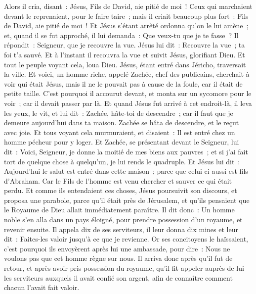 \begin{multicols}{2}
Alors il cria, disant~: Jésus, Fils de David, aie pitié de moi~!
Ceux qui marchaient devant le reprenaient, pour le faire taire~; mais il criait beaucoup plus fort~: Fils de David, aie pitié de moi~!
Et Jésus s'étant arrêté ordonna qu'on le lui amène~; et, quand il se fut approché,
il lui demanda~: Que veux-tu que je te fasse~? Il répondit~: Seigneur, que je recouvre la vue.
Jésus lui dit~: Recouvre la vue~; ta foi t'a sauvé.
Et à l'instant il recouvra la vue et suivit Jésus, glorifiant Dieu. Et tout le peuple voyant cela, loua Dieu.
\VerseOne{}Jésus, étant entré dans Jéricho, traversait la ville.
Et voici, un homme riche, appelé Zachée, chef des publicains, cherchait à voir qui était Jésus,
mais il ne le pouvait pas à cause de la foule, car il était de petite taille.
C'est pourquoi il accourut devant, et monta sur un sycomore pour le voir~; car il devait passer par là.
Et quand Jésus fut arrivé à cet endroit-là, il leva les yeux, le vit, et lui dit~: Zachée, hâte-toi de descendre~; car il faut que je demeure aujourd'hui dans ta maison.
Zachée se hâta de descendre, et le reçut avec joie.
Et tous voyant cela murmuraient, et disaient~: Il est entré chez un homme pécheur pour y loger.
Et Zachée, se présentant devant le Seigneur, lui dit~: Voici, Seigneur, je donne la moitié de mes biens aux pauvres~; et si j'ai fait tort de quelque chose à quelqu'un, je lui rends le quadruple.
Et Jésus lui dit~: Aujourd'hui le salut est entré dans cette maison~; parce que celui-ci aussi est fils d'Abraham.
Car le Fils de l'homme est venu chercher et sauver ce qui était perdu.
Et comme ils entendaient ces choses, Jésus poursuivit son discours, et proposa une parabole, parce qu'il était près de Jérusalem, et qu'ils pensaient que le Royaume de Dieu allait immédiatement paraître.
Il dit donc~: Un homme noble s'en alla dans un pays éloigné, pour prendre possession d'un royaume, et revenir ensuite.
Il appela dix de ses serviteurs, il leur donna dix mines et leur dit~: Faites-les valoir jusqu'à ce que je revienne.
Or ses concitoyens le haïssaient, c'est pourquoi ils envoyèrent après lui une ambassade, pour dire~: Nous ne voulons pas que cet homme règne sur nous.
 Il arriva donc après qu'il fut de retour, et après avoir pris possession du royaume, qu'il fit appeler auprès de lui les serviteurs auxquels il avait confié son argent, afin de connaître comment chacun l'avait fait valoir.

\end{multicols}
